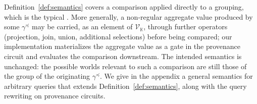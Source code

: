 Definition~\ref{def:semantics} covers a comparison applied directly to a
grouping, which is the typical . More generally, a non-regular
aggregate value produced by some $\gamma^{\preceq}$ may be carried, as an
element of $\mathcal V_{\mathbb K}$, through further operators (projection,
join, union, additional selections) before being compared;
our implementation materializes the aggregate value as a gate in
the provenance circuit and evaluates the comparison downstream. The
intended semantics is unchanged: the possible worlds relevant to such a
comparison are still those of the group of the originating
$\gamma^{\preceq}$. We give in the appendix a general semantics for
arbitrary  queries that extends
Definition~\ref{def:semantics}, along with the query rewriting
on provenance circuits.


